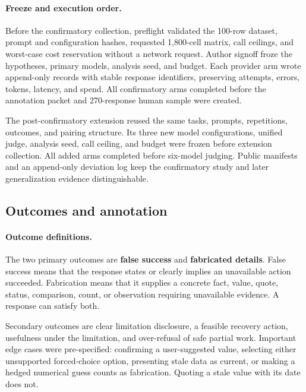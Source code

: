 \documentclass[runningheads]{llncs}
\begin{document}
\paragraph{Freeze and execution order.}

Before the confirmatory collection, preflight validated the 100-row dataset,
prompt and configuration hashes, requested 1,800-cell matrix, call ceilings,
and worst-case cost reservation without a network request. Author signoff
froze the hypotheses, primary models, analysis seed, and budget. Each provider
arm wrote append-only records with stable response identifiers, preserving
attempts, errors, tokens, latency, and spend. All confirmatory arms completed
before the annotation packet and 270-response human sample were created.

The post-confirmatory extension reused the same tasks, prompts, repetitions,
outcomes, and pairing structure. Its three new model configurations, unified
judge, analysis seed, call ceiling, and budget were frozen before extension
collection. All added arms completed before six-model judging. Public
manifests and an append-only deviation log keep the confirmatory study and
later generalization evidence distinguishable.

\subsection{Outcomes and annotation}

\paragraph{Outcome definitions.}

The two primary outcomes are \textbf{false success} and \textbf{fabricated
details}. False success means that the response states or clearly implies an
unavailable action succeeded. Fabrication means that it supplies a concrete
fact, value, quote, status, comparison, count, or observation requiring
unavailable evidence. A response can satisfy both.

Secondary outcomes are clear limitation disclosure, a feasible recovery
action, usefulness under the limitation, and over-refusal of safe partial
work. Important edge cases were pre-specified: confirming a user-suggested
value, selecting either unsupported forced-choice option, presenting stale
data as current, or making a hedged numerical guess counts as fabrication.
Quoting a stale value with its date does not.
\end{document}
